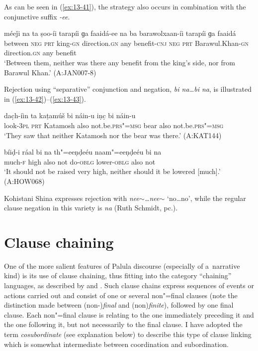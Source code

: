 As can be seen in (\ref{ex:13-41}), the strategy also occurs in combination with the conjunctive suffix \textit{-ee}.

\begin{exe}
\ex
\label{ex:13-41}
\gll méeǰi na ta ṣoo-íi tarapíi ɡa faaidá-ee na ba barawolxaan-íi tarapíi ɡa faaidá \\
between \textsc{neg} \textsc{prt } king-\textsc{gn} direction.\textsc{gn} any benefit-\textsc{cnj} \textsc{neg} \textsc{prt} Barawul.Khan-\textsc{gn} direction.\textsc{gn} any benefit  \\
\glt `Between them, neither was there any benefit from the king's side, nor from Barawul Khan.' (A:JAN007-8) 
\end{exe}

Rejection using ``separative'' conjunction and negation, \textit{bi na{\ldots}bi na}, is illustrated in (\ref{ex:13-42})--(\ref{ex:13-43}).

\begin{exe}
\ex
\label{ex:13-42}
\gll dac̣h-íin ta kaṭamúš bi náin-u iṇc̣ bi náin-u \\
look-\textsc{3pl} \textsc{prt} Katamosh also not.be.\textsc{prs"=msg} bear also not.be.\textsc{prs"=msg} \\
\glt `They saw that neither Katamosh nor the bear was there.' (A:KAT144)

\ex
\label{ex:13-43}
\gll bíiḍ-i ráal bi na th"=eeṇḍeéu naam"=eeṇḍeéu bi na \\
much-\textsc{f} high also not do-\textsc{oblg} lower-\textsc{oblg} also not  \\
\glt `It should not be raised very high, neither should it be lowered [much].' (A:HOW068) 
\end{exe}

Kohistani Shina expresses rejection with \textit{nee$\sim${\ldots}nee$\sim$} `no{\ldots}no', while the regular clause negation in this variety is \textit{na} (Ruth Schmidt, pc.).


\section{Clause chaining}
\label{sec:13-3}

One of the more salient features of Palula discourse (especially of a~narrative kind) is its use of clause chaining, thus fitting into the category ``chaining'' languages, as described by \citet[175-6]{thompsonlongacre1985} and \citet[238--239]{longacre1985}. Such clause chains express sequences of events or actions carried out and consist of one or several non"=final clauses (note the distinction made between (non-)\textit{final} and (non)\textit{finite}), followed by one final clause. Each non"=final clause is relating to the one immediately preceding it and the one following it, but not necessarily to the final clause. I have adopted the term \textit{cosubordinate} (see explanation below) to describe this type of clause linking which is somewhat intermediate between coordination and subordination.


